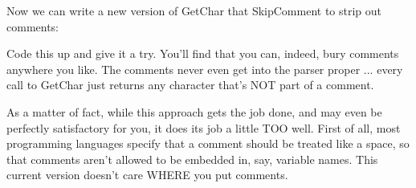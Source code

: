 \documentclass[float=false, crop=false]{standalone}
\begin{document}
Now we can write a new version of GetChar that SkipComment to strip out
comments:

\begin{code}
{--------------------------------------------------------------}
{ Get Character from Input Stream }
{ Skip Any Comments }

procedure GetChar;
begin
   GetCharX;
   if Look = '{' then SkipComment;
end;
{--------------------------------------------------------------}
\end{code}

Code this up and give it a try. You'll find that you can, indeed, bury comments
anywhere you like. The comments never even get into the parser proper ... every
call to GetChar just returns any character that's NOT part of a comment.

As a matter of fact, while this approach gets the job done, and may even be
perfectly satisfactory for you, it does its job a little TOO well. First of all,
most programming languages specify that a comment should be treated like a
space, so that comments aren't allowed to be embedded in, say, variable names.
This current version doesn't care WHERE you put comments.
\end{document}
